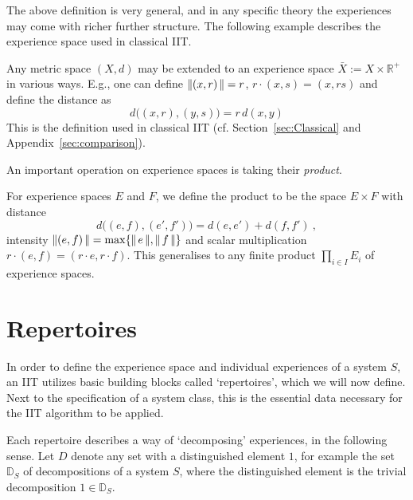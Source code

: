 The above definition is very general, and in any specific theory the experiences may come with richer further structure. The following example describes the experience space used in classical IIT.

\begin{example} \label{ex:IITProto}
Any metric space $(X,d)$ may be extended to an experience space $\bar X := X \times \mathbb{R}^+$ in various ways. E.g., 
one can define $\operatorname{| \hspace*{-0.1em}|} (x,r) \operatorname{| \hspace*{-0.1em}|} = r$, $r \cdot (x,s) = (x, rs)$ and define the distance as
\begin{equation}\label{eq:ExIITProto}
d\big((x,r),(y,s)\big) = r \, d(x,y) 
\end{equation}
This is the definition used in classical IIT (cf. Section~\ref{sec:Classical} and Appendix~\ref{sec:comparison}).
\end{example}


An important operation on experience spaces is taking their \emph{product}. 

\begin{definition} \label{def:prod-spaces}
For experience spaces $E$ and $F$, we define the product to be the space $E \times F$ with distance
\begin{equation}\label{eq:DistanceProduct}
d\big( (e,f) , (e',f') \big) = d(e,e') + d(f, f')  \:,
\end{equation} 
intensity $\operatorname{| \hspace*{-0.1em}|} (e,f) \operatorname{| \hspace*{-0.1em}|} = \max \{ \operatorname{| \hspace*{-0.1em}|} e \operatorname{| \hspace*{-0.1em}|}, \operatorname{| \hspace*{-0.1em}|} f \operatorname{| \hspace*{-0.1em}|} \}$ and scalar multiplication $r \cdot (e,f) = (r \cdot e, r \cdot f)$.
This generalises to any finite product $\prod_{i \in I} E_i$ of experience spaces.
\end{definition}





\section{Repertoires} \label{sec:repertoires}


In order to define the experience space and individual experiences of a system $S$, an IIT utilizes basic building blocks called `repertoires', which we will now define.
Next to the specification of a system class, this is the essential data necessary for the IIT algorithm to be applied.

Each repertoire describes a way of `decomposing' experiences, in the following sense. Let $D$ denote any set with a distinguished element $1$, for example the set $\mathbb D_S$ of decompositions of a system $S$, where the distinguished element is the trivial decomposition $1 \in \mathbb D_S$.

